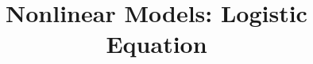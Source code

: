 \documentclass{beamer}
\title[MATH 2250 - Section 2.5]{Nonlinear Models: Logistic Equation}
\begin{document}
\begin{frame}
\titlepage
\end{frame}
\end{document}
